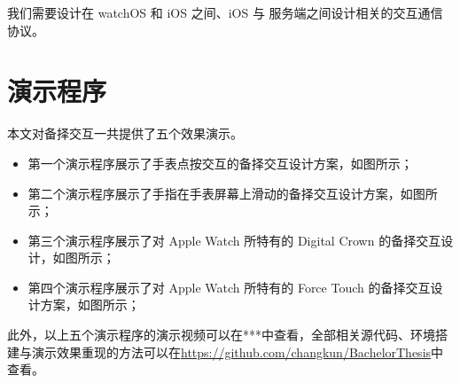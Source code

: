 我们需要设计在 watchOS 和 iOS 之间、iOS 与 服务端之间设计相关的交互通信协议。

\section{演示程序}

本文对备择交互一共提供了五个效果演示。

\begin{itemize}
    \item 第一个演示程序展示了手表点按交互的备择交互设计方案，如图所示；
    \item 第二个演示程序展示了手指在手表屏幕上滑动的备择交互设计方案，如图所示；
    \item 第三个演示程序展示了对 Apple Watch 所特有的 Digital Crown 的备择交互设计，如图所示；
    \item 第四个演示程序展示了对 Apple Watch 所特有的 Force Touch 的备择交互设计方案，如图所示；
\end{itemize}

此外，以上五个演示程序的演示视频可以在***中查看，全部相关源代码、环境搭建与演示效果重现的方法可以在\url{https://github.com/changkun/BachelorThesis}中查看。

